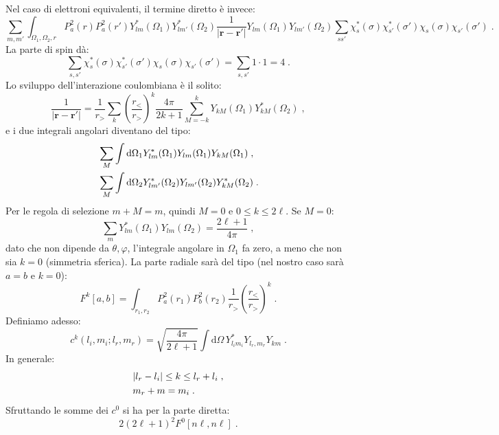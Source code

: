 \documentclass[10pt,a4paper]{report}
\theoremstyle{definition}
\numberwithin{equation}{section}
\newcommand{\diff}[1][]{\mathrm{d}#1}
\begin{document}
Nel caso di elettroni equivalenti, il termine diretto è invece:
\begin{equation}
\sum_{m,m'}\int_{\Omega_1,\Omega_2,r}P_a^2(r)P_a^2(r')Y_{lm}^*(\Omega_1)Y_{lm'}^*(\Omega_2)\frac{1}{|\mathbf{r}-\mathbf{r}'|}Y_{lm}(\Omega_1)Y_{lm'}(\Omega_2)\sum_{ss'}\chi_s^*(\sigma)\chi_{s'}^*(\sigma')\chi_s(\sigma)\chi_{s'}(\sigma')\;.
\end{equation}
La parte di spin dà:
\begin{equation}
\sum_{s,s'}\chi_s^*(\sigma)\chi_{s'}^*(\sigma')\chi_s(\sigma)\chi_{s'}(\sigma')=\sum_{s,s'}1\cdot 1=4\;.
\end{equation}
Lo sviluppo dell'interazione coulombiana è il solito:
\begin{equation}
\frac{1}{|\mathbf{r}-\mathbf{r}'|}=\frac{1}{r_>}\sum_k\left(\frac{r_<}{r_>}\right)^k\frac{4\pi}{2k+1}\sum_{M=-k}^kY_{kM}(\Omega_1)Y_{kM}^*(\Omega_2)\;,
\end{equation}
e i due integrali angolari diventano del tipo:
\begin{align}
&\sum_M\int\diff{\Omega_1} Y_{lm}^*(\Omega_1)Y_{lm}(\Omega_1)Y_{kM}(\Omega_1) \notag\;, \\
&\sum_M\int\diff{\Omega_2} Y_{lm'}^*(\Omega_2)Y_{lm'}(\Omega_2)Y^*_{kM}(\Omega_2)\;.
\end{align}
Per le regola di selezione $m+M=m$, quindi $M=0$ e $0\le k\le 2\ell$. Se $M=0$:
\begin{equation}
\sum_m Y_{lm}^*(\Omega_1)Y_{lm}(\Omega_2)=\frac{2\ell+1}{4\pi}\;,
\end{equation}
dato che non dipende da $\theta,\varphi$, l'integrale angolare in $\Omega_1$ fa zero, a meno che non sia $k=0$ (simmetria sferica). La parte radiale sarà del tipo (nel nostro caso sarà $a=b$ e $k=0$):
\begin{equation}
F^k[a,b]=\int_{r_1,r_2} P_a^2(r_1)P_b^2(r_2)\frac{1}{r_>}\left(\frac{r_<}{r_>}\right)^k\;.
\end{equation}
Definiamo adesso:
\begin{equation}
c^k(l_i,m_i;l_r,m_r)=\sqrt{\frac{4\pi}{2\ell+1}}\int\diff{\Omega}\,Y_{l_im_i}^*Y_{l_r,m_r}Y_{km}\;.
\end{equation}
In generale:
\begin{align}
&|l_r-l_i|\le k\le l_r+l_i \notag\;, \\
&m_r+m=m_i\;.
\end{align}
Sfruttando le somme dei $c^0$ si ha per la parte diretta:
\begin{equation}
2(2\ell+1)^2F^0[n\ell,n\ell]\;.
\end{equation}
\end{document}
